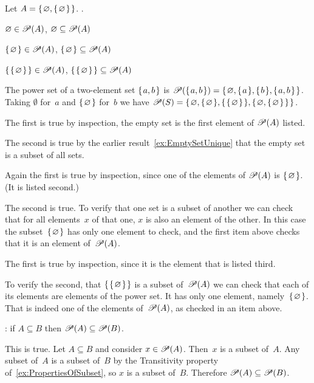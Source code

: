 \documentclass{ibl}  %
\begin{document}
\begin{ex}  Let $A=\mbox{$\{\hspace{0.1em}\varnothing,\mbox{$\{\hspace{0.1em}\varnothing\hspace{0.1em}\}$}\hspace{0.1em}\}$}$. \pord.
\begin{exes}
\item $\varnothing\in\mathscr{P}(A)$, 
  $\varnothing\subseteq\mathscr{P}(A)$    
\item $\mbox{$\{\hspace{0.1em}\varnothing\hspace{0.1em}\}$}\in\mathscr{P}(A)$, 
  $\mbox{$\{\hspace{0.1em}\varnothing\hspace{0.1em}\}$}\subseteq\mathscr{P}(A)$    
\item $\mbox{$\{\hspace{0.1em}\mbox{$\{\hspace{0.1em}\varnothing\hspace{0.1em}\}$}\hspace{0.1em}\}$}\in\mathscr{P}(A)$,    
  $\mbox{$\{\hspace{0.1em}\mbox{$\{\hspace{0.1em}\varnothing\hspace{0.1em}\}$}\hspace{0.1em}\}$}\subseteq\mathscr{P}(A)$    
\end{exes}
\begin{ans}
The power set of a two-element set $\mbox{$\{\hspace{0.1em}a,b\hspace{0.1em}\}$}$ is 
$\mathscr{P}(\mbox{$\{\hspace{0.1em}a,b\hspace{0.1em}\}$})=\mbox{$\{\hspace{0.1em}\varnothing,\mbox{$\{\hspace{0.1em}a\hspace{0.1em}\}$},\mbox{$\{\hspace{0.1em}b\hspace{0.1em}\}$},\mbox{$\{\hspace{0.1em}a,b\hspace{0.1em}\}$}\hspace{0.1em}\}$}$.
Taking $\emptyset$ for~$a$ and $\mbox{$\{\hspace{0.1em}\varnothing\hspace{0.1em}\}$}$ for~$b$ we have
$\mathscr{P}(S)=\mbox{$\{\hspace{0.1em}\varnothing, \mbox{$\{\hspace{0.1em}\varnothing\hspace{0.1em}\}$}, \mbox{$\{\hspace{0.1em}\mbox{$\{\hspace{0.1em}\varnothing\hspace{0.1em}\}$}\hspace{0.1em}\}$}, 
                   \mbox{$\{\hspace{0.1em}\varnothing, \mbox{$\{\hspace{0.1em}\varnothing\hspace{0.1em}\}$}\hspace{0.1em}\}$}\hspace{0.1em}\}$}$.
\begin{exes}
\item The first is true by inspection, the empty set is the first element
  of $\mathscr{P}(A)$ listed.

  The second is true by the earlier result~\ref{ex:EmptySetUnique}
  that the empty set is a subset of all sets.
\item Again the first is true by inspection, 
  since one of the elements of $\mathscr{P}(A)$ is 
  $\mbox{$\{\hspace{0.1em}\varnothing\hspace{0.1em}\}$}$.  (It is listed second.)

  The second is true.
  To verify that one set is a subset of another we can check that for all
  elements~$x$ of that one, $x$ is also an element of the other.
  In this case the subset~$\mbox{$\{\hspace{0.1em}\varnothing\hspace{0.1em}\}$}$ has only one element to check,
  and the first item above checks that it is an element of~$\mathscr{P}(A)$.
\item The first is true by inspection, since it is the element that is listed
  third.

  To verify the second,
  that $\mbox{$\{\hspace{0.1em}\mbox{$\{\hspace{0.1em}\varnothing\hspace{0.1em}\}$}\hspace{0.1em}\}$}$ is a subset of~$\mathscr{P}(A)$
  we can check that each of its elements are elements of the power set.
  It has only one element, namely~$\mbox{$\{\hspace{0.1em}\varnothing\hspace{0.1em}\}$}$.
  That is indeed one of the elements of~$\mathscr{P}(A)$, as checked in 
  an item above. 
\end{exes}
\end{ans}
\end{ex}

\begin{ex} \pord:
if $A\subseteq B$ then $\mathscr{P}(A)\subseteq\mathscr{P}(B)$.  
\begin{ans}
This is true.
Let $A\subseteq B$ and consider $x\in\mathscr{P}(A)$.
Then~$x$ is a subset of~$A$.
Any subset of~$A$ is a subset of~$B$ by 
the Transitivity property of~\ref{ex:PropertiesOfSubset},
so $x$ is a subset of~$B$.
Therefore $\mathscr{P}(A)\subseteq\mathscr{P}(B)$.
\end{ans}
\end{ex}
\end{document}

